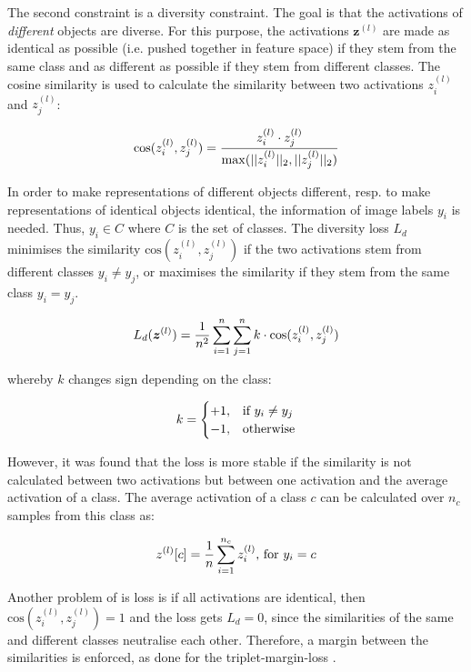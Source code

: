 The second constraint is a diversity constraint. The goal is that the activations of \emph{different} objects are diverse. For this purpose, the activations $\boldsymbol{z}^{(l)}$ are made as identical as possible (i.e. pushed together in feature space) if they stem from the same class and as different as possible if they stem from different classes.
The cosine similarity is used to calculate the similarity between two activations $z^{(l)}_i$ and $z^{(l)}_j$:

\begin{equation}\eqlbl{vso_5}
		\text{cos}(z^{(l)}_i, z^{(l)}_j) = \frac{z^{(l)}_i \cdot z^{(l)}_j}{\max(||z^{(l)}_i||_2, ||z^{(l)}_j||_2)}
\end{equation}

In order to make representations of different objects different, resp. to make representations of identical objects identical, the information of image labels $y_i$ is needed. Thus, $y_i \in C$ where $C$ is the set of classes.
The diversity loss $L_d$ minimises the similarity $\text{cos}(z^{(l)}_i, z^{(l)}_j)$ if the two activations stem from different classes $y_i \neq y_j$, or maximises the similarity if they stem from the same class $y_i = y_j$.

\begin{equation}\eqlbl{vso_6}
		L_{d}(\boldsymbol{z}^{(l)}) = \frac{1}{n^2} \sum_{i=1}^{n} \sum_{j=1}^{n} k \cdot \text{cos}(z^{(l)}_i, z^{(l)}_j)
\end{equation}

whereby $k$ changes sign depending on the class:

\begin{equation}\eqlbl{vso_7}
		k = \begin{cases}
      		+1, & \text{if}\ y_i \neq y_j \\
      		-1, & \text{otherwise}
    	\end{cases}
\end{equation}

However, it was found that the loss is more stable if the similarity is not calculated between two activations but between one activation and the average activation of a class. The average activation of a class $c$ can be calculated over $n_c$ samples from this class as:

\begin{equation}\eqlbl{vso_8}
		z^{(l)}[c] = \frac{1}{n} \sum_{i=1}^{n_c} z^{(l)}_i \text{, for } y_i = c
\end{equation}

Another problem of is loss is if all activations are identical, then $\text{cos}(z^{(l)}_i, z^{(l)}_j) = 1$ and the loss gets $L_{d}=0$, since the similarities of the same and different classes neutralise each other.
Therefore, a margin between the similarities is enforced, as done for the triplet-margin-loss  .

